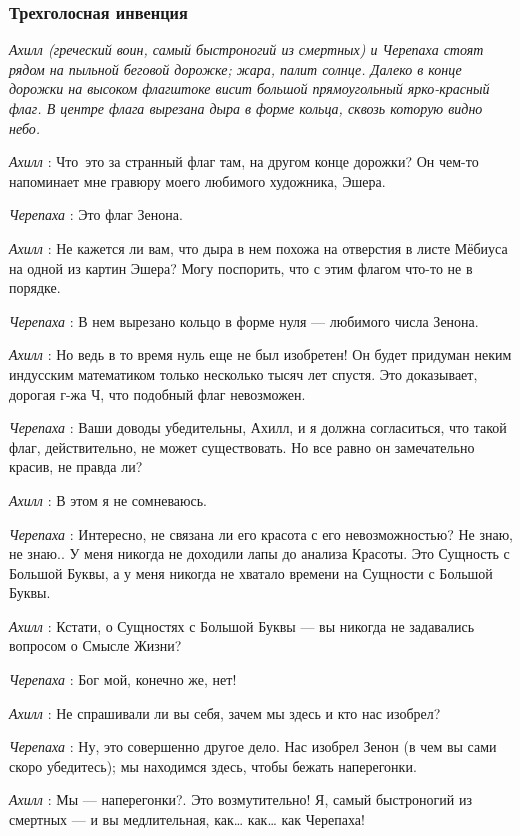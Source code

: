 \subsubsection{Трехголосная инвенция}

\emph{Ахилл (греческий воин, самый быстроногий из смертных) и Черепаха стоят рядом на пыльной беговой дорожке; жара, палит солнце. Далеко в конце дорожки на высоком флагштоке висит большой прямоугольный ярко-красный флаг. В центре флага вырезана дыра в форме кольца, сквозь которую видно небо.}

\emph{Ахилл} : Что~это за странный флаг там, на другом конце дорожки? Он чем-то напоминает мне гравюру моего любимого художника, Эшера.

\emph{Черепаха} : Это флаг Зенона.

\emph{Ахилл} : Не кажется ли вам, что дыра в нем похожа на отверстия в листе Мёбиуса на одной из картин Эшера? Могу поспорить, что с этим флагом что-то не в порядке.

\emph{Черепаха} : В нем вырезано кольцо в форме нуля --- любимого числа Зенона.

\emph{Ахилл} : Но ведь в то время нуль еще не был изобретен! Он будет придуман неким индусским математиком только несколько тысяч лет спустя. Это доказывает, дорогая г-жа Ч, что подобный флаг невозможен.

\emph{Черепаха} : Ваши доводы убедительны, Ахилл, и я должна согласиться, что такой флаг, действительно, не может существовать. Но все равно он замечательно красив, не правда ли?

\emph{Ахилл} : В этом я не сомневаюсь.

\emph{Черепаха} : Интересно, не связана ли его красота с его невозможностью? Не знаю, не знаю.. У меня никогда не доходили лапы до анализа Красоты. Это Сущность с Большой Буквы, а у меня никогда не хватало времени на Сущности с Большой Буквы.

\emph{Ахилл} : Кстати, о Сущностях с Большой Буквы --- вы никогда не задавались вопросом о Смысле Жизни?

\emph{Черепаха} : Бог мой, конечно же, нет!

\emph{Ахилл} : Не спрашивали ли вы себя, зачем мы здесь и кто нас изобрел?

\emph{Черепаха} : Ну, это совершенно другое дело. Нас изобрел Зенон (в чем вы сами скоро убедитесь); мы находимся здесь, чтобы бежать наперегонки.

\emph{Ахилл} : Мы --- наперегонки?. Это возмутительно! Я, самый быстроногий из смертных --- и вы медлительная, как\ldots{} как\ldots{} как Черепаха!

